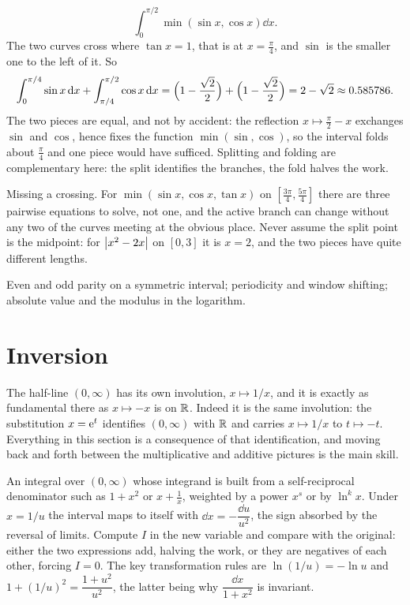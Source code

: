 \begin{worked}
\[\int_0^{\pi/2}\min(\sin x,\cos x)\dd x.\]
The two curves cross where $\tan x=1$, that is at $x=\tfrac{\pi}{4}$, and $\sin$ is the smaller one to the left of it. So
\[\int_0^{\pi/4}\sin x\,\mathrm{d} x+\int_{\pi/4}^{\pi/2}\cos x\,\mathrm{d} x=\Bigl(1-\frac{\sqrt2}{2}\Bigr)+\Bigl(1-\frac{\sqrt2}{2}\Bigr)=2-\sqrt2\approx0.585786.\]
The two pieces are equal, and not by accident: the reflection $x\mapsto\tfrac{\pi}{2}-x$ exchanges $\sin$ and $\cos$, hence fixes the function $\min(\sin,\cos)$, so the interval folds about $\tfrac{\pi}{4}$ and one piece would have sufficed. Splitting and folding are complementary here: the split identifies the branches, the fold halves the work.
\end{worked}

\begin{trap}
Missing a crossing. For $\min(\sin x,\cos x,\tan x)$ on $[\tfrac{3\pi}{4},\tfrac{5\pi}{4}]$ there are three pairwise equations to solve, not one, and the active branch can change without any two of the curves meeting at the obvious place. Never assume the split point is the midpoint: for $\left\lvert x^{2}-2x\right\rvert$ on $[0,3]$ it is $x=2$, and the two pieces have quite different lengths.
\end{trap}

\begin{seealsob}Even and odd parity on a symmetric interval; periodicity and window shifting; absolute value and the modulus in the logarithm.\end{seealsob}

\section{Inversion}

The half-line $(0,\infty)$ has its own involution, $x\mapsto1/x$, and it is exactly as fundamental there as $x\mapsto-x$ is on $\mathbb{R}$. Indeed it is the same involution: the substitution $x=\mathrm{e}^{t}$ identifies $(0,\infty)$ with $\mathbb{R}$ and carries $x\mapsto1/x$ to $t\mapsto-t$. Everything in this section is a consequence of that identification, and moving back and forth between the multiplicative and additive pictures is the main skill.

\cue An integral over $(0,\infty)$ whose integrand is built from a self-reciprocal denominator such as $1+x^{2}$ or $x+\tfrac1x$, weighted by a power $x^{s}$ or by $\ln^{k}x$.
\method Under $x=1/u$ the interval maps to itself with $\dd x=-\dfrac{\dd u}{u^{2}}$, the sign absorbed by the reversal of limits. Compute $I$ in the new variable and compare with the original: either the two expressions add, halving the work, or they are negatives of each other, forcing $I=0$. The key transformation rules are $\ln(1/u)=-\ln u$ and $1+(1/u)^{2}=\dfrac{1+u^{2}}{u^{2}}$, the latter being why $\dfrac{\dd x}{1+x^{2}}$ is invariant.

